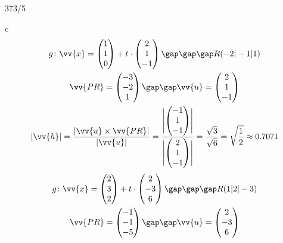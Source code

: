 \begin{exercise}{373/5}
  \item [c]
  \begin{gather*}
    g \colon \vv{x} = \begin{pmatrix}1 \\ 1 \\ 0\end{pmatrix} + t \cdot \begin{pmatrix}2 \\ 1 \\ -1\end{pmatrix} \gap\gap\gap R(-2|-1|1) \\
    \vv{PR} = \begin{pmatrix}-3 \\ -2 \\ 1\end{pmatrix} \gap\gap \vv{u} = \begin{pmatrix}2 \\ 1 \\ -1\end{pmatrix} \\
    |\vv{h}| = \frac{|\vv{u} \times \vv{PR}|}{|\vv{u}|} = \frac{\Biggl|\begin{pmatrix}-1 \\ 1 \\ -1\end{pmatrix}\Biggr|}{\Biggl|\begin{pmatrix}2 \\ 1 \\ -1\end{pmatrix}\Biggr|} = \frac{\sqrt{3}}{\sqrt{6}} = \sqrt{\frac{1}{2}} \approx 0.7071
  \end{gather*}
  \begin{gather*}
    g \colon \vv{x} = \begin{pmatrix}2 \\ 3 \\ 2\end{pmatrix} + t \cdot \begin{pmatrix}2 \\ -3 \\ 6\end{pmatrix} \gap\gap\gap R(1|2|-3) \\
    \vv{PR} = \begin{pmatrix}-1 \\ -1 \\ -5\end{pmatrix} \gap\gap \vv{u} = \begin{pmatrix}2 \\ -3 \\ 6\end{pmatrix} \\

\end{gather*}
\end{exercise}
